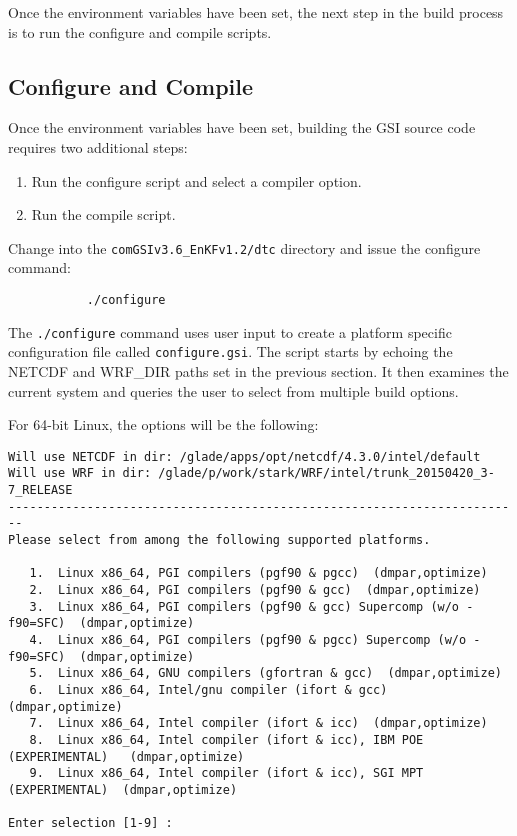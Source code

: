 Once the environment variables have been set, the next step in the build process is to run the configure and compile scripts.

\subsection{Configure and Compile} \label{ch2_compiling_configandcompile}

Once the environment variables have been set, building the GSI source code requires two additional steps:
\begin{enumerate}
\item Run the configure script and select a compiler option.
\item Run the compile script.
\end{enumerate}
Change into the \verb|comGSIv3.6_EnKFv1.2/dtc| directory and issue the configure command: 
\begin{verbatim}
           ./configure
\end{verbatim}
The \verb|./configure| command uses user input to create a platform specific configuration file called 
\verb|configure.gsi|. The script starts by echoing the NETCDF and WRF\_DIR paths set in the previous 
section. It then examines the current system and queries the user to select from multiple build options.

For 64-bit Linux, the options will be the following:
\begin{scriptsize}
\begin{verbatim}
Will use NETCDF in dir: /glade/apps/opt/netcdf/4.3.0/intel/default
Will use WRF in dir: /glade/p/work/stark/WRF/intel/trunk_20150420_3-7_RELEASE
------------------------------------------------------------------------
Please select from among the following supported platforms.

   1.  Linux x86_64, PGI compilers (pgf90 & pgcc)  (dmpar,optimize)
   2.  Linux x86_64, PGI compilers (pgf90 & gcc)  (dmpar,optimize)
   3.  Linux x86_64, PGI compilers (pgf90 & gcc) Supercomp (w/o -f90=SFC)  (dmpar,optimize)
   4.  Linux x86_64, PGI compilers (pgf90 & pgcc) Supercomp (w/o -f90=SFC)  (dmpar,optimize)
   5.  Linux x86_64, GNU compilers (gfortran & gcc)  (dmpar,optimize)
   6.  Linux x86_64, Intel/gnu compiler (ifort & gcc)	 (dmpar,optimize)
   7.  Linux x86_64, Intel compiler (ifort & icc)  (dmpar,optimize)
   8.  Linux x86_64, Intel compiler (ifort & icc), IBM POE (EXPERIMENTAL)   (dmpar,optimize)
   9.  Linux x86_64, Intel compiler (ifort & icc), SGI MPT (EXPERIMENTAL)  (dmpar,optimize)

Enter selection [1-9] :
\end{verbatim}
\end{scriptsize}

